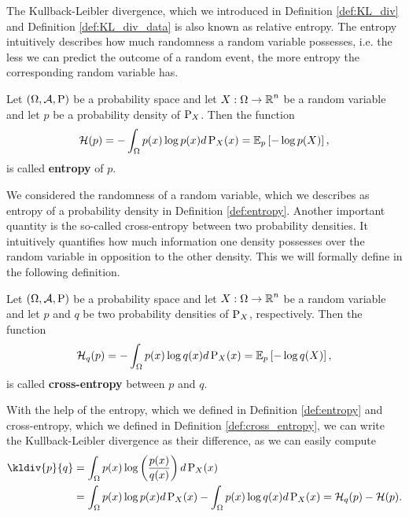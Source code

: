 The Kullback-Leibler divergence, which we introduced in Definition \ref{def:KL_div} and Definition \ref{def:KL_div_data} is also known as relative entropy. The entropy intuitively describes how much \glqq randomness\grqq{} a random variable possesses, i.e. the less we can predict the outcome of a random event, the more entropy the corresponding random variable has.

\begin{definition}\label{def:entropy}
Let $(\Omega,\operatorname{\mathcal{A}}, \operatorname{\text{P}})$ be a probability space and let $X:\Omega \to \operatorname{\mathbb{R}}^n$ be a random variable and let $p$ be a probability density of $\operatorname{\text{P}}_X$. Then the function
\begin{align}
\mathcal{H}(p) = -\int_{\Omega} p(x) \log p(x)d\operatorname{\text{P}}_X(x) = \operatorname{\mathbb{E}}_p \left[ - \log p(X) \right],
\end{align}
is called \textbf{entropy} of $p$.
\end{definition}

We considered the \glqq randomness\grqq{} of a random variable, which we describes as entropy of a probability density in Definition \ref{def:entropy}. Another important quantity is the so-called cross-entropy between two probability densities. It intuitively quantifies how much information one density possesses over the random variable in opposition to the other density. This we will formally define in the following definition.

\begin{definition}\label{def:cross_entropy}
Let $(\Omega,\operatorname{\mathcal{A}}, \operatorname{\text{P}})$ be a probability space and let $X:\Omega \to \operatorname{\mathbb{R}}^n$ be a random variable and let $p$ and $q$ be two probability densities of $\operatorname{\text{P}}_X$, respectively. Then the function
\begin{align}
\mathcal{H}_q(p) = -\int_{\Omega} p(x) \log q(x)d\operatorname{\text{P}}_X(x) = \operatorname{\mathbb{E}}_p \left[ - \log q(X) \right],
\end{align}
is called \textbf{cross-entropy} between $p$ and $q$.
\end{definition}

With the help of the entropy, which we defined in Definition \ref{def:entropy} and cross-entropy, which we defined in Definition \ref{def:cross_entropy}, we can write the Kullback-Leibler divergence as their difference, as we can easily compute
\begin{align}\label{eq:kl_entropy}
\kldiv{p}{q} &= \int_\O p(x) \log \left( \frac{p(x)}{q(x)}\right) d\prob_X(x)\nonumber\\
 &=\int_\O p(x) \log p(x) d\prob_X(x) - \int_\O p(x) \log  q(x) d\prob_X(x) = \H_q(p) - \H(p).
\end{align}


